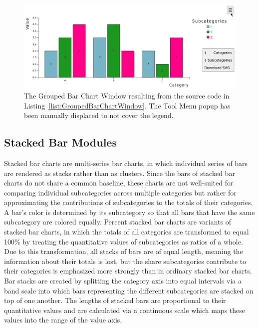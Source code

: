   
\begin{figure}[tp]
\centering
\includegraphics[keepaspectratio,width=\linewidth,height=\fullh]
{images/grouped-bar-chart-window.png}
\caption[Grouped Bar Chart Window Example]{%
The Grouped Bar Chart Window resulting from the source code in
Listing~\ref{list:GroupedBarChartWindow}. The Tool Menu popup has
been manually displaced to not cover the legend.
}
\label{fig:GroupedBarChartWindow}
\end{figure}








\subsection{Stacked Bar Modules}

Stacked bar charts are multi-series bar charts, in which individual
series of bars are rendered as stacks rather than as clusters. Since
the bars of stacked bar charts do not share a common baseline, these
charts are not well-suited for comparing individual subcategories
across multiple categories but rather for approximating the
contributions of subcategories to the totals of their categories. A
bar's color is determined by its subcategory so that all bars that
have the same subcategory are colored equally. Percent stacked bar
charts are variants of stacked bar charts, in which the totals of all
categories are transformed to equal 100\% by treating the quantitative
values of subcategories as ratios of a whole. Due to this
transformation, all stacks of bars are of equal length, meaning the
information about their totals is lost, but the share subcategories
contribute to their categories is emphasized more strongly than in
ordinary stacked bar charts. Bar stacks are created by splitting the
category axis into equal intervals via a band scale into which bars
representing the different subcategories are stacked on top of one
another. The lengths of stacked bars are proportional to their
quantitative values and are calculated via a continuous scale which
maps these values into the range of the value axis.


